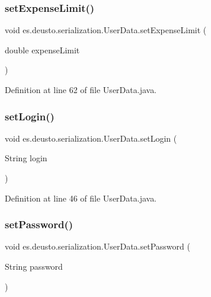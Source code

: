 \subsubsection{\texorpdfstring{set\+Expense\+Limit()}{setExpenseLimit()}}
{\footnotesize\ttfamily void es.\+deusto.\+serialization.\+User\+Data.\+set\+Expense\+Limit (\begin{DoxyParamCaption}\item[{double}]{expense\+Limit }\end{DoxyParamCaption})}



Definition at line 62 of file User\+Data.\+java.

\mbox{\label{classes_1_1deusto_1_1serialization_1_1_user_data_a4a1de61a3a73d1d217be31c868f5674b}} 
\subsubsection{\texorpdfstring{set\+Login()}{setLogin()}}
{\footnotesize\ttfamily void es.\+deusto.\+serialization.\+User\+Data.\+set\+Login (\begin{DoxyParamCaption}\item[{String}]{login }\end{DoxyParamCaption})}



Definition at line 46 of file User\+Data.\+java.

\mbox{\label{classes_1_1deusto_1_1serialization_1_1_user_data_a28efba1d140f0b371bfc777d1c825614}} 
\subsubsection{\texorpdfstring{set\+Password()}{setPassword()}}
{\footnotesize\ttfamily void es.\+deusto.\+serialization.\+User\+Data.\+set\+Password (\begin{DoxyParamCaption}\item[{String}]{password }\end{DoxyParamCaption})}



